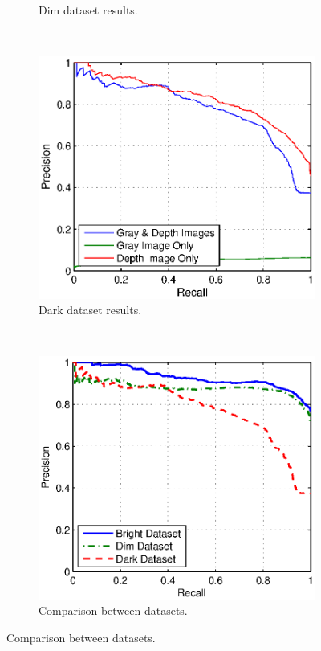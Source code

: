 \documentclass[]{spie}  %
\begin{document}
\begin{figure}[!htb]
\begin{subfigure}[b]{0.48\textwidth}
        \caption{Dim dataset results.}
        \label{subfig:pr_dim}
        \end{subfigure}
        ~
        \begin{subfigure}[b]{0.48\textwidth}
        \centering
        \includegraphics[trim = 0mm 0mm 5mm 0mm, clip, width=\textwidth]{figures/pr_dark.eps}    
        \caption{Dark dataset results.}
        \label{subfig:pr_bright}
        \end{subfigure}
        ~ 
        \begin{subfigure}[b]{0.48\textwidth}
        \centering
        \includegraphics[trim = 0mm 0mm 5mm 0mm, clip, width=\textwidth]{figures/pr_all.eps}    
        \caption{Comparison between datasets.}
        \label{subfig:pr_dim}
        \end{subfigure}


\end{figure}
\end{document}
